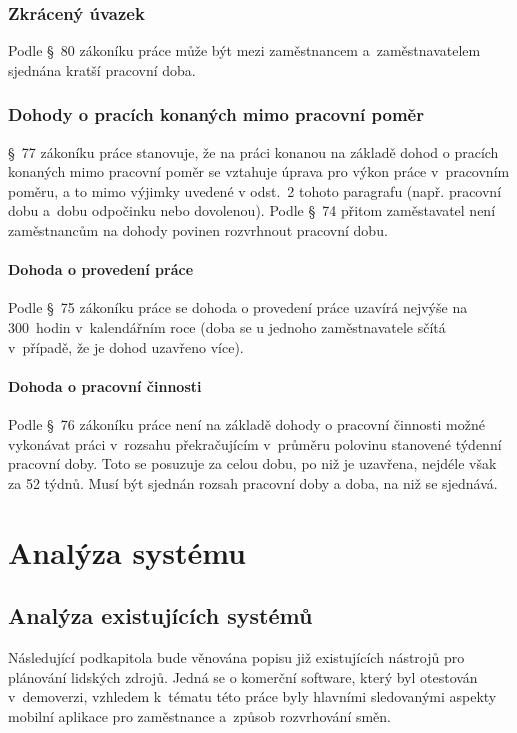 \documentclass[twoside]{ctuthesis}
\begin{document}
\subsection{Zkrácený úvazek}
Podle §~80 zákoníku práce může být mezi zaměstnancem a~zaměstnavatelem sjednána kratší pracovní doba.

\subsection{Dohody o pracích konaných mimo pracovní poměr}
§~77 zákoníku práce stanovuje, že na práci konanou na základě dohod o pracích konaných mimo pracovní poměr se vztahuje úprava pro výkon práce v~pracovním poměru, a to mimo výjimky uvedené v odst.~2 tohoto paragrafu (např. pracovní dobu a~dobu odpočinku nebo dovolenou). Podle §~74 přitom zaměstavatel není zaměstnancům na dohody povinen rozvrhnout pracovní dobu.

\subsubsection{Dohoda o provedení práce}
Podle §~75 zákoníku práce se dohoda o provedení práce uzavírá nejvýše na 300~hodin v~kalendářním roce (doba se u jednoho zaměstnavatele sčítá v~případě, že je dohod uzavřeno více).

\subsubsection{Dohoda o pracovní činnosti}
Podle §~76 zákoníku práce není na základě dohody o pracovní činnosti možné vykonávat práci v~rozsahu překračujícím v~průměru polovinu stanovené týdenní pracovní doby. Toto se posuzuje za celou dobu, po niž je uzavřena, nejdéle však za 52 týdnů. Musí být sjednán rozsah pracovní doby a doba, na niž se sjednává.


\chapter{Analýza systému}

\section{Analýza existujících systémů}
Následující podkapitola bude věnována popisu již existujících nástrojů pro plánování lidských zdrojů. Jedná se o komerční software, který byl otestován v~demoverzi, vzhledem k~tématu této práce byly hlavními sledovanými aspekty mobilní aplikace pro zaměstnance a~způsob rozvrhování směn.
\end{document}

